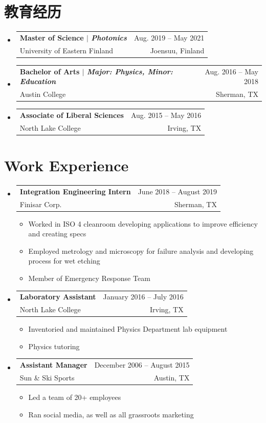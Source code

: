 \documentclass[A4, 11pt, UTF8]{ctexart}
\makeatletter
\newcommand{\CVItem}[1]{
	\item\small{
		{#1 \vspace{-2pt}}
	}
}
\newcommand{\CVSubheading}[4]{
	\vspace{-2pt}\item
	\begin{tabular*}{0.97\textwidth}[t]{l@{\extracolsep{\fill}}r}
		\textbf{#1} & #2 \\
		\small#3 & \small #4 \\
	\end{tabular*}\vspace{-7pt}
}
\newcommand{\CVSubHeadingListStart}{\begin{itemize}[leftmargin=0.5cm, label={}]}
\newcommand{\CVSubHeadingListEnd}{\end{itemize}}
\newcommand{\CVItemListStart}{\begin{itemize}}
\newcommand{\CVItemListEnd}{\end{itemize}\vspace{-5pt}}
\makeatother
\begin{document}
	
		
		\section{教育经历}
		\CVSubHeadingListStart
		\CVSubheading
		{{Master of Science $|$ \emph{\small{Photonics}}}}{Aug. 2019 -- May 2021}
		{University of Eastern Finland}{Joensuu, Finland}
		\CVSubheading
		{{Bachelor of Arts $|$ \emph{\small{Major: Physics, Minor: Education}}}}{Aug. 2016 -- May 2018}
		{Austin College}{Sherman, TX}
		\CVSubheading
		{Associate of Liberal Sciences}{Aug. 2015 -- May 2016}
		{North Lake College}{Irving, TX}
		\CVSubHeadingListEnd
		

		
		\section{Work Experience}
		\CVSubHeadingListStart
		\CVSubheading
		{Integration Engineering Intern}{June 2018 -- August 2019}
		{Finisar Corp.}{Sherman, TX}
		\CVItemListStart
		\CVItem{Worked in ISO 4 cleanroom developing applications to improve efficiency and creating specs}
		\CVItem{Employed metrology and microscopy for failure analysis and developing process for wet etching}
		\CVItem{Member of Emergency Response Team}
		\CVItemListEnd
		\CVSubheading
		{Laboratory Assistant}{January 2016 -- July 2016}
		{North Lake College}{Irving, TX}
		\CVItemListStart
		\CVItem{Inventoried and maintained Physics Department lab equipment}
		\CVItem{Physics tutoring}
		\CVItemListEnd
		\CVSubheading
		{Assistant Manager}{December 2006 -- August 2015}
		{Sun \& Ski Sports}{Austin, TX}
		\CVItemListStart
		\CVItem{Led a team of 20+ employees}
		\CVItem{Ran social media, as well as all grassroots marketing}
		\CVItemListEnd
		\CVSubHeadingListEnd
		
\end{document}

